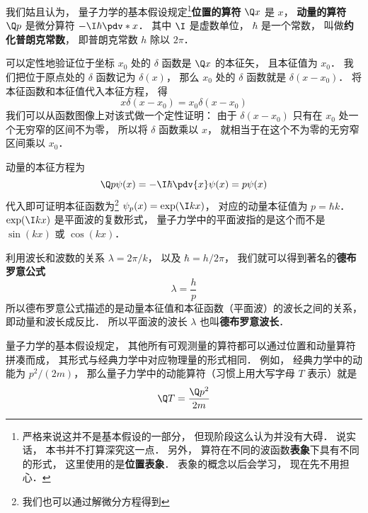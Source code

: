 我们姑且认为， 量子力学的基本假设规定\footnote{严格来说这并不是基本假设的一部分， 但现阶段这么认为并没有大碍． 说实话， 本书并不打算深究这一点． 另外， 算符在不同的波函数\textbf{表象}下具有不同的形式， 这里使用的是\textbf{位置表象}． 表象的概念以后会学习， 现在先不用担心．}\textbf{位置的算符} $\Q x$ 是 $x$， \textbf{动量的算符} $\Q p$ 是微分算符 $-\I\hbar \pdv*{x}$． 其中 $\I$ 是虚数单位， $\hbar$ 是一个常数， 叫做\textbf{约化普朗克常数}， 即普朗克常数 $h$ 除以 $2\pi$．

可以定性地验证位于坐标 $x_0$ 处的 $\delta$ 函数是 $\Q x$ 的本征矢， 且本征值为 $x_0$． 我们把位于原点处的 $\delta$ 函数记为 $\delta(x)$， %
那么 $x_0$ 处的 $\delta$ 函数就是 $\delta (x - x_0)$． 将本征函数和本征值代入本征方程， 得
\begin{equation}
x \delta(x - x_0) = x_0 \delta(x - x_0)
\end{equation}
我们可以从函数图像上对该式做一个定性证明： 由于 $\delta(x - x_0)$ 只有在 $x_0$ 处一个无穷窄的区间不为零， 所以将 $\delta$ 函数乘以 $x$， 就相当于在这个不为零的无穷窄区间乘以 $x_0$．

动量的本征方程为
\begin{equation}
\Q p \psi(x) = -\I\hbar \pdv{x} \psi(x) = p \psi(x)
\end{equation}
代入即可证明本征函数为\footnote{我们也可以通过解微分方程得到} $\psi_p(x) = \exp(\I k x)$， 对应的动量本征值为 $p = \hbar k$． $\exp(\I k x)$ 是平面波的复数形式， 量子力学中的平面波指的是这个而不是 $\sin(kx)$ 或 $\cos(kx)$．

利用波长和波数的关系%
$\lambda = 2\pi/k$， 以及 $\hbar = h/2\pi$， 我们就可以得到著名的\textbf{德布罗意公式}
\begin{equation}
\lambda = \frac{h}{p}
\end{equation}
所以德布罗意公式描述的是动量本征值和本征函数（平面波）的波长之间的关系， 即动量和波长成反比． 所以平面波的波长 $\lambda$ 也叫\textbf{德布罗意波长}．

量子力学的基本假设规定， 其他所有可观测量的算符都可以通过位置和动量算符拼凑而成， 其形式与经典力学中对应物理量的形式相同． 例如， 经典力学中的动能为 $p^2/(2m)$， 那么量子力学中的动能算符（习惯上用大写字母 $T$ 表示）就是
\begin{equation}
\Q T = \frac{\Q p^2}{2m}
\end{equation}

